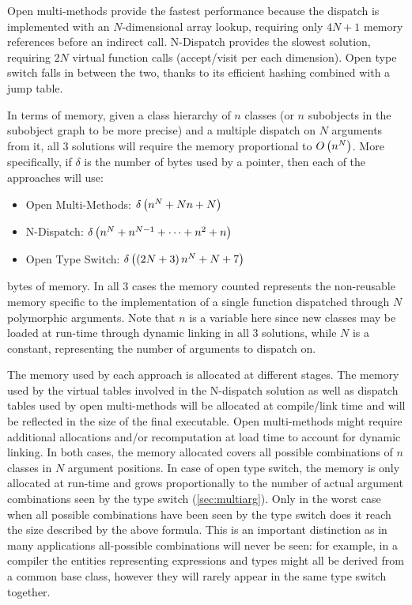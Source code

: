 Open multi-methods provide the fastest performance because the dispatch is 
implemented with an $N$-dimensional array lookup, requiring only $4N+1$ memory 
references before an indirect call. N-Dispatch provides the slowest solution, 
requiring $2N$ virtual function calls (accept/visit per each dimension). Open 
type switch falls in between the two, thanks to its efficient hashing combined 
with a jump table.

In terms of memory, given a class hierarchy of $n$ classes (or $n$ subobjects in 
the subobject graph to be more precise) and a multiple dispatch on $N$ arguments 
from it, all 3 solutions will require the memory proportional to $O\left(n^N\right)$. 
More specifically, if $\delta$ is the number of bytes used by a pointer, then 
each of the approaches will use:

\begin{itemize}
\setlength{\itemsep}{0pt}
\setlength{\parskip}{0pt}
\item Open Multi-Methods: $\delta\left(n^N+Nn+N\right)$
\item N-Dispatch: $\delta\left(n^N+n^{N-1}+\cdots+n^2+n\right)$
\item Open Type Switch: $\delta\left(\left(2N+3\right)n^N+N+7\right)$
\end{itemize}

\noindent
bytes of memory. In all 3 cases the memory counted represents the non-reusable 
memory specific to the implementation of a single function dispatched through 
$N$ polymorphic arguments. Note that $n$ is a variable here since new classes 
may be loaded at run-time through dynamic linking in all 3 solutions, while $N$ 
is a constant, representing the number of arguments to dispatch on.

The memory used by each approach is allocated at different stages. The memory 
used by the virtual tables involved in the N-dispatch solution as well as 
dispatch tables used by open multi-methods will be allocated at compile/link 
time and will be reflected in the size of the final executable. Open 
multi-methods might require additional allocations and/or recomputation at load 
time to account for dynamic linking. In both cases, the memory allocated covers 
all possible combinations of $n$ classes in $N$ argument positions. In case of 
open type switch, the memory is only allocated at run-time and grows proportionally 
to the number of actual argument combinations seen by the type switch 
(\textsection\ref{sec:multiarg}). Only in the worst case when all possible 
combinations have been seen by the type switch does it reach the size described 
by the above formula. This is an important distinction as in many applications 
all-possible combinations will never be seen: for example, in a compiler the 
entities representing expressions and types might all be derived from a common 
base class, however they will rarely appear in the same type switch together.

